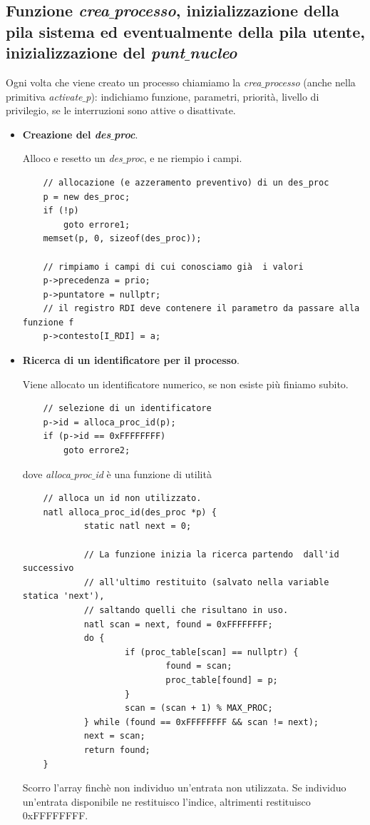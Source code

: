 \documentclass[11pt]{report}
\theoremstyle{definition}
\begin{document}
\subsection{Funzione \emph{crea$\_$processo}, inizializzazione della pila sistema ed eventualmente della pila utente, inizializzazione del \emph{punt$\_$nucleo}}
	Ogni volta che viene creato un processo chiamiamo la \emph{crea$\_$processo} (anche nella primitiva \emph{activate$\_$p}): indichiamo funzione, parametri, priorità, livello di privilegio, se le interruzioni sono attive o disattivate.
\begin{itemize}
	\item \textbf{Creazione del \emph{des$\_$proc}}.
	
	Alloco e resetto un \emph{des$\_$proc}, e ne riempio i campi.
	\small
	\begin{verbatim}
	// allocazione (e azzeramento preventivo) di un des_proc
	p = new des_proc;
	if (!p)
	    goto errore1;
	memset(p, 0, sizeof(des_proc));
	
	// rimpiamo i campi di cui conosciamo già  i valori
	p->precedenza = prio;
	p->puntatore = nullptr;
	// il registro RDI deve contenere il parametro da passare alla funzione f
	p->contesto[I_RDI] = a;
	\end{verbatim}
	\normalsize
	\item \textbf{Ricerca di un identificatore per il processo}.
	
	Viene allocato un identificatore numerico, se non esiste più finiamo subito.
	\small
	\begin{verbatim}
	// selezione di un identificatore
	p->id = alloca_proc_id(p);
	if (p->id == 0xFFFFFFFF)
	    goto errore2;
	\end{verbatim}
	\normalsize 
	dove \emph{alloca$\_$proc$\_$id} è una funzione di utilità
	\small
	\begin{verbatim}
	// alloca un id non utilizzato.
	natl alloca_proc_id(des_proc *p) {
		    static natl next = 0;
		
		    // La funzione inizia la ricerca partendo  dall'id successivo
		    // all'ultimo restituito (salvato nella variable statica 'next'),
		    // saltando quelli che risultano in uso.
		    natl scan = next, found = 0xFFFFFFFF;
		    do {
			        if (proc_table[scan] == nullptr) {
				            found = scan;
				            proc_table[found] = p;
			        }
			        scan = (scan + 1) % MAX_PROC;
		    } while (found == 0xFFFFFFFF && scan != next);
		    next = scan;
		    return found;
	}
	\end{verbatim}
	\normalsize 
	Scorro l'array finchè non individuo un'entrata non utilizzata. Se individuo un'entrata disponibile ne restituisco l'indice, altrimenti restituisco 0xFFFFFFFF.
	

\end{itemize}
\end{document}
